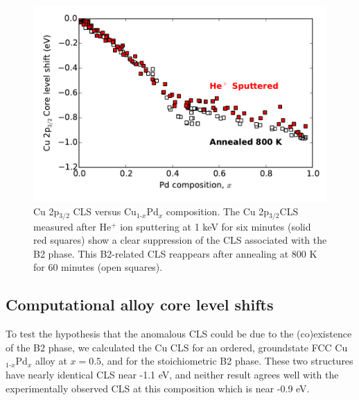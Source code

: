 \documentclass[number, sort&compress, review, 12pt]{elsarticle}
\begin{document}
\begin{figure}[H]
\centering
\includegraphics[width=6in]{sputtering}
\caption{\label{fig-sputtering}Cu 2p$_{\text{3/2}}$ CLS versus Cu$_{\text{1-}x}$Pd$_x$ composition. The Cu 2p$_{\text{3/2}}$CLS measured after He$^{\text{+}}$ ion sputtering at 1 keV for six minutes (solid red squares) show a clear suppression of the CLS associated with the B2 phase. This B2-related CLS reappears after annealing at 800 K for 60 minutes (open squares).}
\end{figure}

\subsection{Computational alloy core level shifts}
\label{sec-3-3}
To test the hypothesis that the anomalous CLS could be due to the (co)existence of the B2 phase, we calculated the Cu CLS for an ordered, groundstate FCC Cu$_{\text{1-}x}$Pd$_x$ alloy at $x = 0.5$, and for the stoichiometric B2 phase. These two structures have nearly identical CLS near -1.1 eV, and neither result agrees well with the experimentally observed CLS at this composition which is near -0.9 eV.
\end{document}
